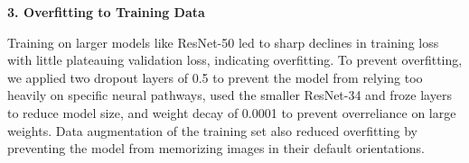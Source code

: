 \documentclass{article} %
\begin{document}
\textbf{3. Overfitting to Training Data}

Training on larger models like ResNet-50 led to sharp declines in training loss with little plateauing validation loss, indicating overfitting. To prevent overfitting, we applied two dropout layers of 0.5 to prevent the model from relying too heavily on specific neural pathways, used the smaller ResNet-34 and froze layers to reduce model size, and weight decay of 0.0001 to prevent overreliance on large weights. Data augmentation of the training set also reduced overfitting by preventing the model from memorizing images in their default orientations.

\label{last_page}



\end{document}
